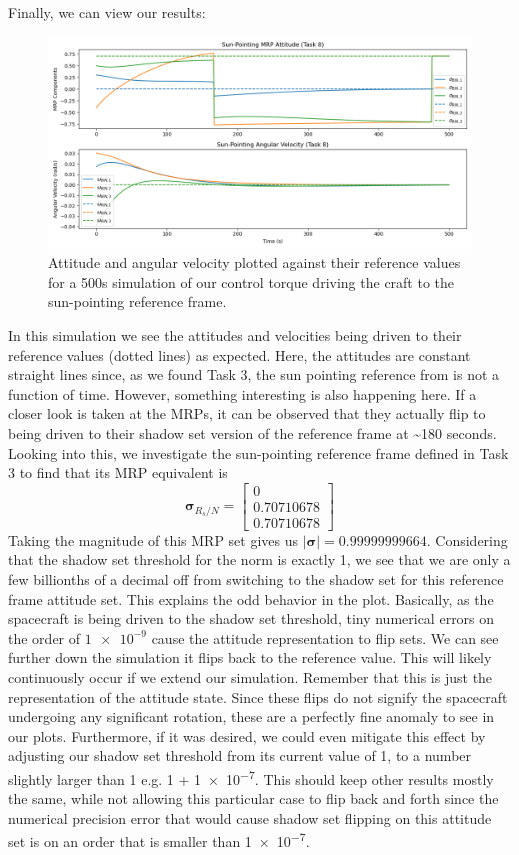 \documentclass[conf]{new-aiaa}
\begin{document}
Finally, we can view our results:
\begin{figure}[H]
    \centering
    \captionsetup{width=.7\linewidth}
    \includegraphics[width=1\linewidth]{task8_sun_pointing_control.png}
    \caption{Attitude and angular velocity plotted against their reference values for a 500s simulation of our control torque driving the craft to the sun-pointing reference frame.}
    \label{fig:enter-label}
\end{figure}
In this simulation we see the attitudes and velocities being driven to their reference values (dotted lines) as expected. Here, the attitudes are constant straight lines since, as we found Task 3, the sun pointing reference from is not a function of time. However, something interesting is also happening here. If a closer look is taken at the MRPs, it can be observed that they actually flip to being driven to their shadow set version of the reference frame at \textasciitilde180 seconds. Looking into this, we investigate the sun-pointing reference frame defined in Task 3 to find that its MRP equivalent is 
\[
\bm{\sigma}_{R_s/N} =
\begin{bmatrix}
0 \\ 0.70710678 \\ 0.70710678
\end{bmatrix}
\]
Taking the magnitude of this MRP set gives us $|\bm\sigma| = 0.99999999664$. Considering that the shadow set threshold for the norm is exactly 1, we see that we are only a few billionths of a decimal off from switching to the shadow set for this reference frame attitude set. This explains the odd behavior in the plot. Basically, as the spacecraft is being driven to the shadow set threshold, tiny numerical errors on the order of $\num{1e-9}$ cause the attitude representation to flip sets. We can see further down the simulation it flips back to the reference value. This will likely continuously occur if we extend our simulation. Remember that this is just the representation of the attitude state. Since these flips do not signify the spacecraft undergoing any significant rotation, these are a perfectly fine anomaly to see in our plots. Furthermore, if it was desired, we could even mitigate this effect by adjusting our shadow set threshold from its current value of 1, to a number slightly larger than 1 e.g. 1 + \num{1e-7}. This should keep other results mostly the same, while not allowing this particular case to flip back and forth since the numerical precision error that would cause shadow set flipping on this attitude set is on an order that is smaller than \num{1e-7}.
\end{document}
